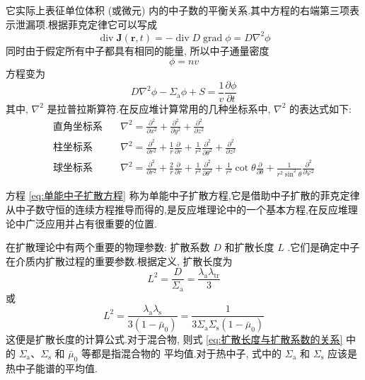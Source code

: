 \documentclass{Sichuan Normal University}
\begin{document}
它实际上表征单位体积 (或微元) 内的中子数的平衡关系.其中方程的右端第三项表示泄漏项.根据菲克定律它可以写成
\begin{equation}
    \operatorname{div} \boldsymbol{J}(\boldsymbol{r}, t)=-\operatorname{div} D \operatorname{grad} \phi=D \nabla^2 \phi
    \label{eq:中子数守恒4}
\end{equation}
同时由于假定所有中子都具有相同的能量, 所以中子通量密度
\begin{equation}
\phi=n v
\end{equation}
方程变为
\begin{equation}
    D \nabla^2 \phi-\Sigma_{\mathrm{a}} \phi+S=\frac{1}{v} \frac{\partial \phi}{\partial t}
    \label{eq:单能中子扩散方程}
\end{equation}其中, $\nabla^2$ 是拉普拉斯算符.在反应堆计算常用的几种坐标系中, $\nabla^2$ 的表达式如下:
\begin{align}
    \text{直角坐标系} & \quad \nabla^2 = \frac{\partial^2}{\partial x^2} + \frac{\partial^2}{\partial y^2} + \frac{\partial^2}{\partial z^2} \\
    \text{柱坐标系} & \quad \nabla^2 = \frac{\partial^2}{\partial r^2} + \frac{1}{r} \frac{\partial}{\partial r} + \frac{1}{r^2} \frac{\partial^2}{\partial \theta^2} + \frac{\partial^2}{\partial z^2} \\
    \text{球坐标系} & \quad \nabla^2 = \frac{\partial^2}{\partial r^2} + \frac{2}{r} \frac{\partial}{\partial r} + \frac{1}{r^2} \frac{\partial^2}{\partial \theta^2} + \frac{1}{r^2} \cot \theta \frac{\partial}{\partial \theta} + \frac{1}{r^2 \sin^2 \theta} \frac{\partial^2}{\partial \varphi^2}
    \end{align}
    
方程 \eqref{eq:单能中子扩散方程} 称为单能中子扩散方程,它是借助中子扩散的菲克定律从中子数守恒的连续方程推导而得的,是反应堆理论中的一个基本方程,在反应堆理论中广泛应用并占有很重要的位置.
\begin{remark}
    在扩散理论中有两个重要的物理参数: 扩散系数 $D$ 和扩散长度 $L$ .它们是确定中子在介质内扩散过程的重要参数.根据定义, 扩散长度为
    \begin{equation}
L^2=\frac{D}{\Sigma_{\mathrm{a}}}=\frac{\lambda_{\mathrm{a}} \lambda_{\mathrm{tr}}}{3}
\label{eq:扩散长度与扩散系数}
\end{equation}
或
\begin{equation}
L^2=\frac{\lambda_{\mathrm{a}} \lambda_{\mathrm{s}}}{3\left(1-\bar{\mu}_0\right)}=\frac{1}{3 \Sigma_{\mathrm{a}} \Sigma_{\mathrm{s}}\left(1-\bar{\mu}_0\right)}
\label{eq:扩散长度与扩散系数的关系}
\end{equation}
这便是扩散长度的计算公式.对于混合物, 则式 \eqref{eq:扩散长度与扩散系数的关系} 中的 $\Sigma_{\mathrm{a}} 、 \Sigma_{\mathrm{s}}$ 和 $\bar{\mu}_0$ 等都是指混合物的
平均值.对于热中子, 式中的 $\Sigma_{\mathrm{a}}$ 和 $\Sigma_{\mathrm{s}}$ 应该是热中子能谱的平均值.
\end{remark}
\end{document}
